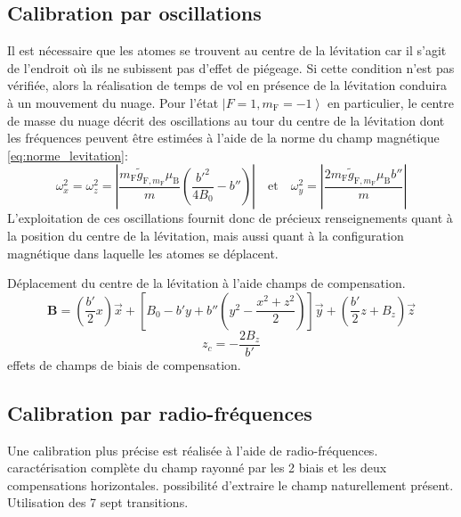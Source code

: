 \subsection{Calibration par oscillations}
\label{sc:oscillations_levitation}
Il est nécessaire que les atomes se trouvent au centre de la lévitation car il s'agit de l'endroit où ils ne subissent pas d'effet de piégeage. Si cette condition n'est pas vérifiée, alors la réalisation de temps de vol en présence de la lévitation conduira à un mouvement du nuage. Pour l'état $\left| F=1, m_{\mathrm{F}}=-1 \right\rangle$ en particulier, le centre de masse du nuage décrit des oscillations au tour du centre de la lévitation dont les fréquences peuvent être estimées à l'aide de la norme du champ magnétique \ref{eq:norme_levitation}:
\begin{equation}
\omega_x^2=\omega_z^2=\left| \frac{m_{\mathrm{F}} \widetilde{g}_{\mathrm{F},m_{\mathrm{F}}} \mu_{\mathrm{B}}}{m} \left( \frac{b'^2}{4 B_0} - b'' \right) \right|
\quad \text{et} \quad
\omega_y^2= \left| \frac{2 m_{\mathrm{F}} \widetilde{g}_{\mathrm{F},m_{\mathrm{F}}} \mu_{\mathrm{B}} b''}{m} \right|
\end{equation}
L'exploitation de ces oscillations fournit donc de précieux renseignements quant à la position du centre de la lévitation, mais aussi quant à la configuration magnétique dans laquelle les atomes se déplacent.


Déplacement du centre de la lévitation à l'aide champs de compensation.
\begin{equation}
\mathbf{B}=\left( \frac{b'}{2}x \right) \vec{x} + \left[ B_0 - b'y + b'' \left( y^2 - \frac{x^2+z^2}{2} \right) \right] \vec{y} + \left( \frac{b'}{2}z +B_z \right) \vec{z}
\end{equation}
\begin{equation}
z_c=-\frac{2B_z}{b'}
\end{equation}
effets de champs de biais de compensation.







\subsection{Calibration par radio-fréquences}
Une calibration plus précise est réalisée à l'aide de radio-fréquences.
caractérisation complète du champ rayonné par les 2 biais et les deux compensations horizontales. possibilité d'extraire le champ naturellement présent. Utilisation des 7 sept transitions. 





